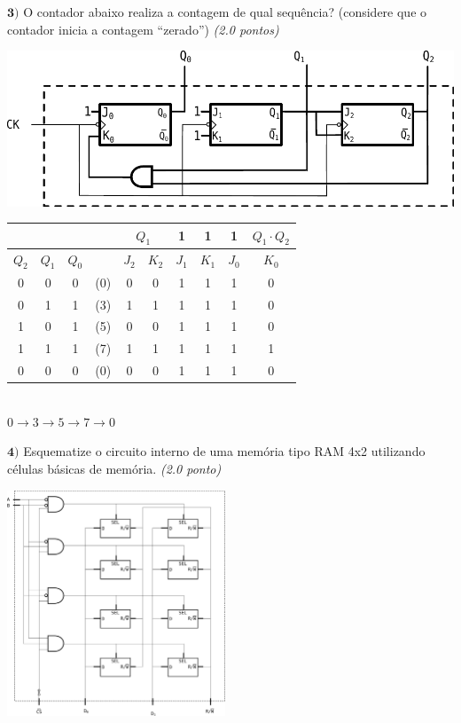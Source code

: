 \documentclass[12pt]{article}
\newcommand{\exerc}[3]{ \vspace*{25pt} {$\mathbf{#1)}$} #2 \hfill {\it #3} }
\begin{document}
\exerc{3}{O contador abaixo realiza a contagem de qual sequência? (considere que
   o contador inicia a contagem ``zerado'')}{(2.0 pontos)}
\begin{center}
  \includegraphics[scale=0.8]{cont2} \\ \vspace{15pt}
\end{center}

\begin{center}
\begin{tabular}{|cccc||cc|cc|cc|}
  \cline{5-10}
  \multicolumn{1}{c}{} & & & & \multicolumn{2}{c|}{$Q_1$} & 1 & 1 & 1 & $Q_1\cdot Q_2$ \\ \hline
  $Q_2$ & $Q_1$ & $Q_0$ & & $J_2$ & $K_2$ & $J_1$ & $K_1$ & $J_0$ & $K_0$ \\ \hline
  0 & 0 & 0 & (0) & 0 & 0 & 1 & 1 & 1 & 0 \\
  0 & 1 & 1 & (3) & 1 & 1 & 1 & 1 & 1 & 0 \\
  1 & 0 & 1 & (5) & 0 & 0 & 1 & 1 & 1 & 0 \\
  1 & 1 & 1 & (7) & 1 & 1 & 1 & 1 & 1 & 1 \\
  0 & 0 & 0 & (0) & 0 & 0 & 1 & 1 & 1 & 0 \\ \hline
\end{tabular}
\\
\vspace{4ex}
$0 \rightarrow 3 \rightarrow 5 \rightarrow 7 \rightarrow 0 $
\end{center}

\vspace{-30pt}
\exerc{4}{Esquematize o circuito interno de uma memória tipo RAM 4x2
  utilizando células básicas de memória.}{(2.0 ponto)}
  \begin{center}
    \includegraphics[width=65mm]{mem4x2}
  \end{center}
\end{document}
